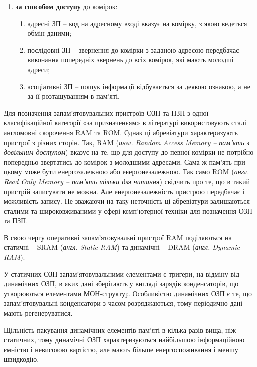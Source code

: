 \begin{enumerate}
 \item \textbf{за способом доступу} до комірок:
   \begin{enumerate}
   \item адресні ЗП -- код на адресному вході вказує на комірку, з якою ведеться обмін даними;
   \item послідовні ЗП -- звернення до комірки з заданою адресою передбачає виконання попередніх звернень до всіх комірок, які мають молодші адреси;
   \item асоціативні ЗП -- пошук інформації відбувається за деякою ознакою, а не за її розташуванням в пам'яті.
   \end{enumerate}        
\end{enumerate}

\vspace{0.1cm}

Для позначення запам'ятовувальних пристроїв ОЗП та ПЗП з одної класифікаційної категорії «за призначенням» в літературі використовують сталі англомовні скорочення RAM та ROM. Однак ці абревіатури характеризують пристрої з різних сторін. Так, RAM (\textit{англ. Random Access Memory -- пам'ять з довільним доступом}) вказує на те, що для доступу до певної комірки не потрібно попередньо звертатись до комірок з молодшими адресами. Сама ж пам'ять при цьому може бути енергозалежною або енергонезалежною. Так само ROM (\textit{англ. Read Only Memory -- пам'ять тільки для читання}) свідчить про те, що в такий пристрій записувати не можна. Але енергонезалежність пристрою передбачає і можливість запису. Не зважаючи на таку неточність ці абревіатури залишаються сталими та широковживаними у сфері комп'ютерної техніки для позначення ОЗП та ПЗП.

В свою чергу оперативні запам'ятовувальні пристрої RAM по\-ді\-ля\-ють\-ся на статичні -- SRAM (\textit{англ. Static RAM}) та динамічні -- DRAM (\textit{англ. Dynamic RAM}).

У статичних ОЗП запам'ятовувальними елементами є тригери, на відміну від динамічних ОЗП, в яких дані зберігають у вигляді зарядів конденсаторів, що утворюються елементами МОН-структур. Особливістю динамічних ОЗП є те, що запам'ятовувальні конденсатори з часом розряджаються, тому періодично дані мають регенеруватися.

Щільність пакування динамічних елементів пам'яті в кілька разів вища, ніж статичних, тому динамічні ОЗП характеризуються найбільшою інформаційною ємністю і невисокою вартістю, але мають більше енергоспоживання і меншу швидкодію.

